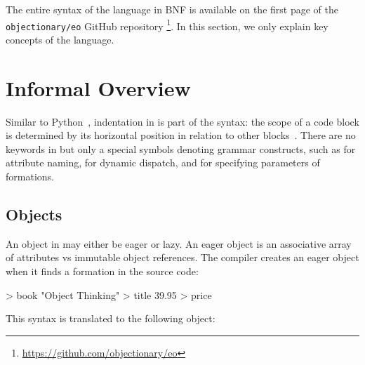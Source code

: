 
The entire syntax of the \eolang{} language in BNF is available on the first page of the \texttt{objectionary/eo} GitHub repository%
  \footnote{\url{https://github.com/objectionary/eo}}.
In this section, we only explain key concepts of the language.

\section{Informal Overview}

Similar to Python~\citep{lutz2013learning}, indentation in \eolang{} is part of the syntax: the scope of a code block is determined by its horizontal position in relation to other blocks~\citep{landin1966next}.
There are no keywords in \eolang{} but only a special symbols denoting grammar constructs, such as \ff{>} for attribute naming,  for dynamic dispatch, and \ff{[]} for specifying parameters of formations.



\subsection{Objects}

An object in \eolang{} may either be eager or lazy.
An eager object is an associative array of attributes vs immutable object references.
The compiler creates an eager object when it finds a formation in the source code:

\begin{ffcode}
[isbn] > book
  "Object Thinking" > title
  39.95 > price
\end{ffcode}

This syntax is translated to the following object:


